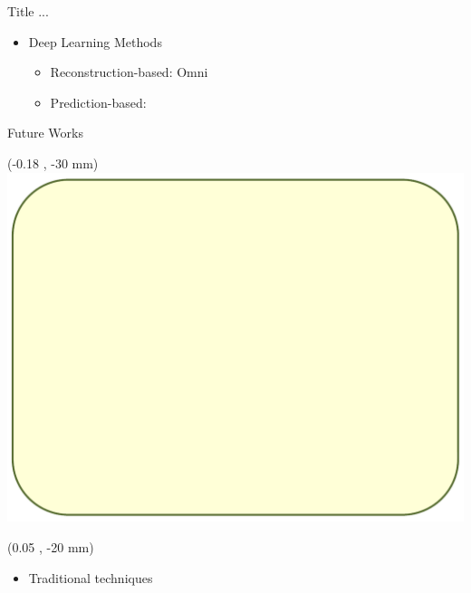 \documentclass[usenames,dvipsnames, xcolor=table, 9pt]{beamer}
\begin{document}
\begin{frame}{Title ...}
\begin{textblock*}{0.8\paperwidth}
\begin{itemize}
			\item[] Deep Learning Methods 
			\vspace{0.3 cm}
			
			\begin{itemize}
				
			\item Reconstruction-based: 	Omni~\cite{omni}
				
					\vspace{0.32 cm}
						
			\item Prediction-based: 
			
	
			
			
		\end{itemize}	
			
	
			
		\end{itemize}
		
	\end{textblock*}
	
	
	
\end{frame}










\begin{frame}{Future Works}
	
	\begin{textblock*}{\paperwidth}(-0.18 \paperwidth, -30 mm)%
		\hfill \includegraphics [width=0.8 \linewidth ]{pics/bg_99}%
		
	\end{textblock*}
	
	\begin{textblock*}{0.75\paperwidth}(0.05 \paperwidth, -20 mm)
		
		\begin{itemize}
		
			
			\item Traditional techniques 
			
	
		
			
		\end{itemize}
		
		
	\end{textblock*}

	
\end{frame}
\end{document}
